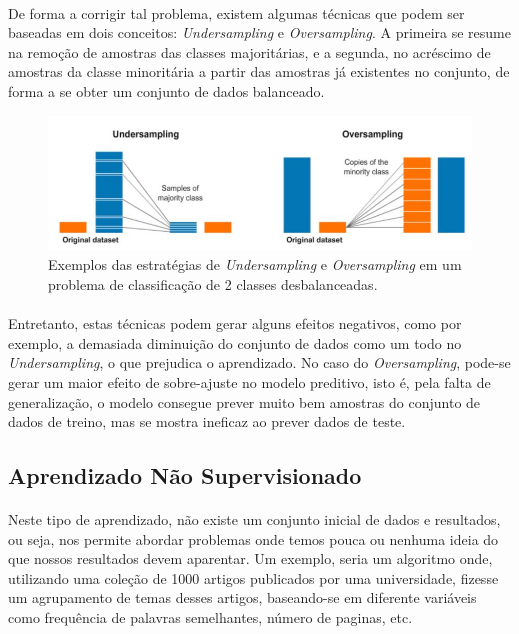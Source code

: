 \documentclass[grad,numbers]{coppe}
\begin{document}
  			\paragraph{}De forma a corrigir tal problema, existem algumas técnicas que podem ser baseadas em dois conceitos: \textit{Undersampling} e \textit{Oversampling}. A primeira se resume na remoção de amostras das classes majoritárias, e a segunda, no acréscimo de amostras da classe minoritária a partir das amostras já existentes no conjunto, de forma a se obter um conjunto de dados balanceado.
				\newpage
  			\begin{figure}[h]
  				\centering
  				\includegraphics[width=13cm]{os_and_us.jpg}
  				\caption{Exemplos das estratégias de \textit{Undersampling} e \textit{Oversampling} em um problema de classificação de 2 classes desbalanceadas\cite{os_and_us}.}
  				\label{fig:os_and_us}
  			\end{figure}
  			\paragraph{}Entretanto, estas técnicas podem gerar alguns efeitos negativos, como por exemplo, a demasiada diminuição do conjunto de dados como um todo no \textit{Undersampling}, o que prejudica o aprendizado. No caso do \textit{Oversampling}, pode-se gerar um maior efeito de sobre-ajuste no modelo preditivo, isto é, pela falta de generalização, o modelo consegue prever muito bem amostras do conjunto de dados de treino, mas se mostra ineficaz ao prever dados de teste.
		\subsection{Aprendizado Não Supervisionado}
			\paragraph{}Neste tipo de aprendizado, não existe um conjunto inicial de dados e resultados, ou seja, nos permite abordar problemas onde temos pouca ou nenhuma ideia do que nossos resultados devem aparentar. Um exemplo, seria um algoritmo onde, utilizando uma coleção de 1000 artigos publicados por uma universidade, fizesse um agrupamento de temas desses artigos, baseando-se em diferente variáveis como frequência de palavras semelhantes, número de paginas, etc.
\end{document}
